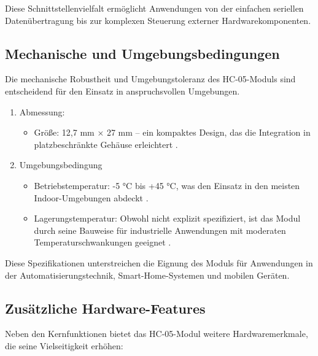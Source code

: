 Diese Schnittstellenvielfalt ermöglicht Anwendungen von der einfachen seriellen Datenübertragung bis zur komplexen Steuerung externer Hardwarekomponenten.	

\subsection {Mechanische und Umgebungsbedingungen}

Die mechanische Robustheit und Umgebungstoleranz des HC-05-Moduls sind entscheidend für den Einsatz in anspruchsvollen Umgebungen.

\begin{enumerate}
    \item Abmessung:
    \begin{itemize}
        \item Größe: 12,7 mm × 27 mm – ein kompaktes Design, das die Integration in platzbeschränkte Gehäuse erleichtert \cite{HC05Datasheet:2010}.
    \end{itemize}
    \item Umgebungsbedingung 
    \begin{itemize}
        \item Betriebstemperatur: -5 °C bis +45 °C, was den Einsatz in den meisten Indoor-Umgebungen abdeckt \cite{ReicheltHC05:2025}.
        \item Lagerungstemperatur: Obwohl nicht explizit spezifiziert, ist das Modul durch seine Bauweise für industrielle Anwendungen mit moderaten Temperaturschwankungen geeignet \cite{HC05Datasheet:2010}.
    \end{itemize} 
\end{enumerate}

Diese Spezifikationen unterstreichen die Eignung des Moduls für Anwendungen in der Automatisierungstechnik, Smart-Home-Systemen und mobilen Geräten.

\subsection{ Zusätzliche Hardware-Features}

Neben den Kernfunktionen bietet das HC-05-Modul weitere Hardwaremerkmale, die seine Vielseitigkeit erhöhen:

